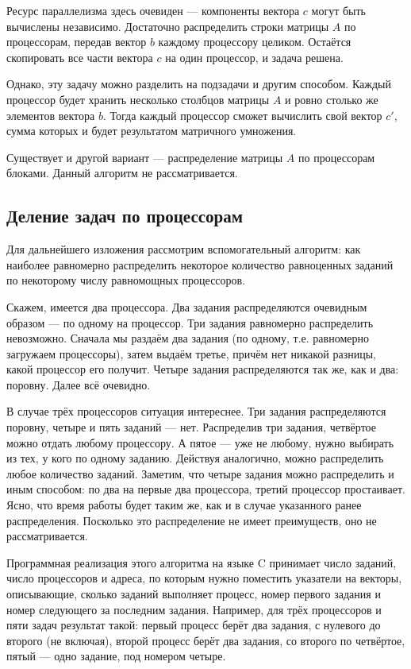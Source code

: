 \documentclass[14pt]{extarticle}
\begin{document}
Ресурс параллелизма здесь очевиден --- компоненты вектора $c$ могут быть вычислены независимо. Достаточно распределить строки матрицы $A$ по процессорам, передав вектор $b$ каждому процессору целиком. Остаётся скопировать все части вектора $c$ на один процессор, и задача решена.

Однако, эту задачу можно разделить на подзадачи и другим способом. Каждый процессор будет хранить несколько столбцов матрицы $A$ и ровно столько же элементов вектора $b$. Тогда каждый процессор сможет вычислить свой вектор $c'$, сумма которых и будет результатом матричного умножения.

Существует и другой вариант --- распределение матрицы $A$ по процессорам блоками. Данный алгоритм не рассматривается.

\subsection{Деление задач по процессорам}
Для дальнейшего изложения рассмотрим вспомогательный алгоритм: как наиболее равномерно распределить некоторое количество равноценных заданий по некоторому числу равномощных процессоров.

Скажем, имеется два процессора. Два задания распределяются очевидным образом --- по одному на процессор. Три задания равномерно распределить невозможно. Сначала мы раздаём два задания (по одному, т.е. равномерно загружаем процессоры), затем выдаём третье, причём нет никакой разницы, какой процессор его получит. Четыре задания распределяются так же, как и два: поровну. Далее всё очевидно.

В случае трёх процессоров ситуация интереснее. Три задания распределяются поровну, четыре и пять заданий --- нет. Распределив три задания, четвёртое можно отдать любому процессору. А пятое --- уже не любому, нужно выбирать из тех, у кого по одному заданию. Действуя аналогично, можно распределить любое количество заданий. Заметим, что четыре задания можно распределить и иным способом: по два на первые два процессора, третий процессор простаивает. Ясно, что время работы будет таким же, как и в случае указанного ранее распределения. Посколько это распределение не имеет преимуществ, оно не рассматривается.

Программная реализация этого алгоритма на языке C принимает число заданий, число процессоров и адреса, по которым нужно поместить указатели на векторы, описывающие, сколько заданий выполняет процесс, номер первого задания и номер следующего за последним задания. Например, для трёх процессоров и пяти задач результат такой: первый процесс берёт два задания, с нулевого до второго (не включая), второй процесс берёт два задания, со второго по четвёртое, пятый --- одно задание, под номером четыре.
\end{document}
